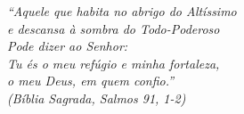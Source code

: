 \begin{epigrafe}
    \vspace*{\fill}
	\begin{flushright}
		\textit{``Aquele que habita no abrigo do Altíssimo \\
		e descansa à sombra do Todo-Poderoso \\
		Pode dizer ao Senhor: \\
		Tu és o meu refúgio e minha fortaleza,\\
		o meu Deus, em quem confio.''\\
		(Bíblia Sagrada, Salmos 91, 1-2)}
	\end{flushright}
\end{epigrafe}
